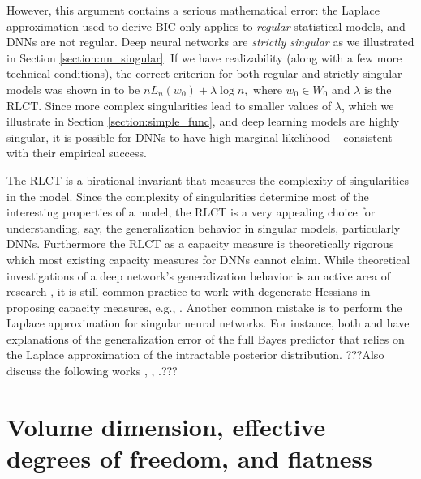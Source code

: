 \documentclass{article} %
\begin{document}
However, this argument contains a serious mathematical error: the Laplace approximation used to derive BIC only applies to \emph{regular} statistical models, and DNNs are not regular. Deep neural networks are \textit{strictly singular} as we illustrated in Section \ref{section:nn_singular}. 
If we have realizability (along with a few more technical conditions), the correct criterion for both regular and strictly singular models was shown in \citet{watanabe_widely_2013} to be 
$
nL_n(w_0) + \lambda \log n,
$
where $w_0 \in W_0$ and $\lambda$ is the RLCT. 
Since more complex singularities lead to smaller values of $\lambda$, which we illustrate in Section \ref{section:simple_func}, and deep learning models are highly singular, it is possible for DNNs to have high marginal likelihood -- consistent with their empirical success. 

The RLCT is a birational invariant \citep{kollar_birational_1998} that measures the complexity of singularities in the model. Since the complexity of singularities determine most of the interesting properties of a model, the RLCT is a very appealing choice for understanding, say, the generalization behavior in singular models, particularly DNNs. Furthermore the RLCT as a capacity measure is theoretically rigorous which most existing capacity measures for DNNs cannot claim. While theoretical investigations of a deep network's generalization behavior is an active area of research \cite{neyshabur_exploring_2017}, it is still common practice to work with degenerate Hessians in proposing capacity measures, e.g., \citet{thomas_information_2019}. Another common mistake is to perform the Laplace approximation for singular neural networks. For instance, both \citet{zhang_energyentropy_2018} and  \citet{le_bayesian_2018} have explanations of the generalization error of the full Bayes predictor that relies on the Laplace approximation of the intractable posterior distribution. ???Also discuss the following works \cite{maddox_rethinking_2020}, \cite{gao_degrees_2016}, \cite{sun_lightlike_2020}.???


\section{Volume dimension, effective degrees of freedom, and flatness}
\label{section:no_flat_minima}
\end{document}
